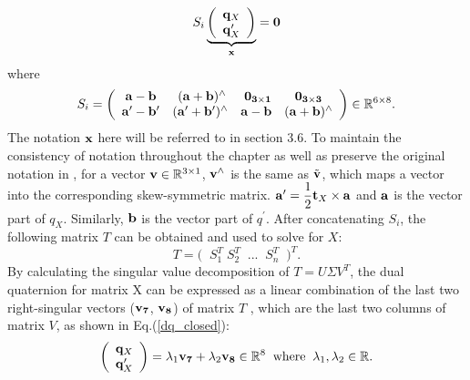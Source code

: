 \documentclass[twocolumn,10pt]{asme2ej}
\newcommand{\ttt}{{\bf t}}
\newcommand{\aaa}{{\bf a}}
\newcommand{\bbb}{{\bf b}}
\newcommand{\xx}{{\bf x}}
\begin{document}
\begin{equation}
S_{i}
\underbrace{
\bigg(
\begin{array}{c}
{\bf q}_{X}\\
{\bf q}^{\prime}_{X}
\end{array}
\bigg)}_{\xx} = \bf 0
\label{dqua}
\end{equation} 
where
\begin{equation}
S_{i} = 
\bigg(
\begin{array}{cccc}

{\aaa} - {\bbb} & \; ({\aaa} + {\bbb})^{\wedge} & \; \bf 0_{3\times 1} & \bf 0_{3\times 3}\\

{\aaa}^{\prime} - {\bbb}^{\prime} & ({{\aaa}^{\prime} + {\bbb}^{\prime}})^{\wedge} & {\aaa} - {\bbb} & ({\aaa} + {\bbb})^{\wedge} 

\end{array}
\bigg) \in \mathbb{R}^{6 \times 8}.
\end{equation}
The notation $\bf x$ here will be referred to in section 3.6. 
To maintain the consistency of notation throughout the chapter as well as preserve the original notation in \cite{daniilidis1996dual}, for a vector ${\bf v} \in \mathbb{R}^{3 \times 1}$, ${\bf v}^{\wedge}$ is the same as  $\tilde{\bf v}$, which maps a vector into the corresponding skew-symmetric matrix. ${\aaa}^{\prime} = \dfrac{1}{2}{\ttt}_{X} \times {\aaa}$ and $\aaa$ is the vector part of $q_{X}$. Similarly,  $\bbb$ is the vector part of $q^{\prime}$.
After concatenating $S_{i}$, the following matrix $T$ can be obtained and used to solve for $X$:
\begin{equation}
T = \big( \; \; S_{1}^{T} \; S_{2}^{T} \; \; ... \; \; S_{n}^{T} \; \; \big)^{T}.
\end{equation}
By calculating the singular value decomposition of $T = U\Sigma V^{T}$, the dual quaternion for matrix X can be expressed as a linear combination of the last two right-singular vectors (${\bf v_{7}}$, ${\bf v_{8}}$) of matrix $T$ , which are the last two columns of matrix $V$, as shown in Eq.(\ref{dq_closed}): 
\begin{equation}
\bigg(
\begin{array}{c}
{\bf q}_{X}\\
{\bf q}^{\prime}_{X}
\end{array}
\bigg) = 
\lambda_{1}{\bf v_{7}} + \lambda_{2}{\bf v_{8}} \in \mathbb{R}^{8} \; \;
\text{where} \; \; \lambda_{1}, \lambda_{2} \in \mathbb{R}.
\label{dq_closed}
\end{equation} 
\end{document}
